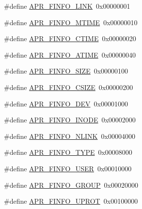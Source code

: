 \begin{DoxyCompactItemize}
\item 
\#define \mbox{\hyperlink{group__apr__file__stat_ga9b0c1d02401b845f928f836fdd3c6712}{A\+P\+R\+\_\+\+F\+I\+N\+F\+O\+\_\+\+L\+I\+NK}}~0x00000001
\item 
\#define \mbox{\hyperlink{group__apr__file__stat_ga992ce1f4f75d519fd2a9d241c5a12515}{A\+P\+R\+\_\+\+F\+I\+N\+F\+O\+\_\+\+M\+T\+I\+ME}}~0x00000010
\item 
\#define \mbox{\hyperlink{group__apr__file__stat_ga98bef78baf71fa63b06352704f128bca}{A\+P\+R\+\_\+\+F\+I\+N\+F\+O\+\_\+\+C\+T\+I\+ME}}~0x00000020
\item 
\#define \mbox{\hyperlink{group__apr__file__stat_ga17d7656d02a35ffc05afe22032a8da15}{A\+P\+R\+\_\+\+F\+I\+N\+F\+O\+\_\+\+A\+T\+I\+ME}}~0x00000040
\item 
\#define \mbox{\hyperlink{group__apr__file__stat_gadf72493da450c0b1e3d279e98a973120}{A\+P\+R\+\_\+\+F\+I\+N\+F\+O\+\_\+\+S\+I\+ZE}}~0x00000100
\item 
\#define \mbox{\hyperlink{group__apr__file__stat_gaf87a09b89935d730cb1ade80d5b6ada0}{A\+P\+R\+\_\+\+F\+I\+N\+F\+O\+\_\+\+C\+S\+I\+ZE}}~0x00000200
\item 
\#define \mbox{\hyperlink{group__apr__file__stat_ga0890d31145211f62d38dd8e444b5660a}{A\+P\+R\+\_\+\+F\+I\+N\+F\+O\+\_\+\+D\+EV}}~0x00001000
\item 
\#define \mbox{\hyperlink{group__apr__file__stat_ga4fee7341395912db501b40de81dbba26}{A\+P\+R\+\_\+\+F\+I\+N\+F\+O\+\_\+\+I\+N\+O\+DE}}~0x00002000
\item 
\#define \mbox{\hyperlink{group__apr__file__stat_gabb2ba05b8ed45e59b1f06e1b7b4c91c2}{A\+P\+R\+\_\+\+F\+I\+N\+F\+O\+\_\+\+N\+L\+I\+NK}}~0x00004000
\item 
\#define \mbox{\hyperlink{group__apr__file__stat_gad5d25f25527ee77c08bb20aae141306c}{A\+P\+R\+\_\+\+F\+I\+N\+F\+O\+\_\+\+T\+Y\+PE}}~0x00008000
\item 
\#define \mbox{\hyperlink{group__apr__file__stat_ga599d92111a5cca379a06980025044e12}{A\+P\+R\+\_\+\+F\+I\+N\+F\+O\+\_\+\+U\+S\+ER}}~0x00010000
\item 
\#define \mbox{\hyperlink{group__apr__file__stat_ga8420798139d34a88678498aa848803ff}{A\+P\+R\+\_\+\+F\+I\+N\+F\+O\+\_\+\+G\+R\+O\+UP}}~0x00020000
\item 
\#define \mbox{\hyperlink{group__apr__file__stat_gac85e4335fcf91881b11b3e8a4b224aca}{A\+P\+R\+\_\+\+F\+I\+N\+F\+O\+\_\+\+U\+P\+R\+OT}}~0x00100000
\item 

\end{DoxyCompactItemize}
